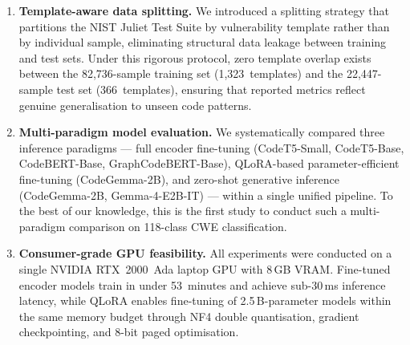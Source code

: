 \begin{enumerate}
    \item \textbf{Template-aware data splitting.}
          We introduced a splitting strategy that partitions the NIST
          Juliet Test Suite by vulnerability template rather than by
          individual sample, eliminating structural data leakage between
          training and test sets.  Under this rigorous protocol, zero
          template overlap exists between the 82,736-sample training set
          (1,323~templates) and the 22,447-sample test set
          (366~templates), ensuring that reported metrics reflect genuine
          generalisation to unseen code patterns.

    \item \textbf{Multi-paradigm model evaluation.}
          We systematically compared three inference paradigms --- full
          encoder fine-tuning (CodeT5-Small, CodeT5-Base, CodeBERT-Base,
          GraphCodeBERT-Base), QLoRA-based parameter-efficient fine-tuning
          (CodeGemma-2B), and zero-shot generative inference
          (CodeGemma-2B, Gemma-4-E2B-IT) --- within a single unified
          pipeline.  To the best of our knowledge, this is the first study
          to conduct such a multi-paradigm comparison on 118-class CWE
          classification.

    \item \textbf{Consumer-grade GPU feasibility.}
          All experiments were conducted on a single NVIDIA RTX~2000~Ada
          laptop GPU with 8\,GB VRAM.  Fine-tuned encoder models train in
          under 53~minutes and achieve sub-30\,ms inference latency, while
          QLoRA enables fine-tuning of 2.5\,B-parameter models within the
          same memory budget through NF4 double quantisation, gradient
          checkpointing, and 8-bit paged optimisation.


\end{enumerate}
